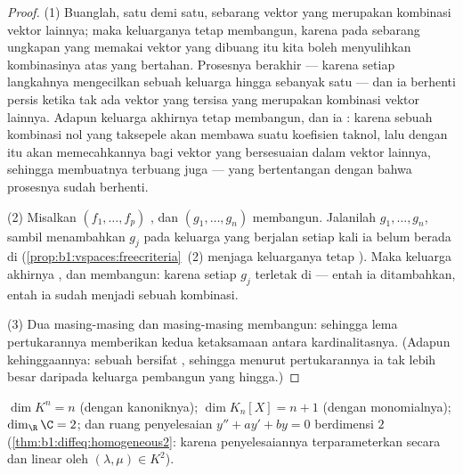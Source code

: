 \begin{proof}
(1) Buanglah, satu demi satu, sebarang vektor yang merupakan kombinasi
vektor lainnya; maka keluarganya tetap membangun, karena pada sebarang ungkapan
yang memakai vektor yang dibuang itu kita boleh menyulihkan kombinasinya atas
yang bertahan. Prosesnya berakhir --- karena setiap langkahnya mengecilkan sebuah
keluarga hingga sebanyak satu --- dan ia berhenti persis ketika tak ada vektor
yang tersisa yang merupakan kombinasi vektor lainnya. Adapun keluarga akhirnya tetap
membangun, dan ia : karena sebuah kombinasi nol yang taksepele akan
membawa suatu koefisien taknol, lalu  dengan itu akan memecahkannya
bagi vektor yang bersesuaian dalam vektor lainnya, sehingga membuatnya
terbuang juga --- yang bertentangan dengan bahwa prosesnya sudah
berhenti.

(2) Misalkan $(f_1, \dots, f_p)$ , dan $(g_1, \dots, g_n)$ membangun.
Jalanilah $g_1, \dots, g_n$, sambil menambahkan $g_j$ pada keluarga yang berjalan
setiap kali ia belum berada di 
(\cref{prop:b1:vspaces:freecriteria}~(2) menjaga keluarganya tetap ).
Maka keluarga akhirnya , dan membangun: karena setiap $g_j$ terletak di
 --- entah ia ditambahkan, entah ia sudah menjadi sebuah kombinasi.

(3) Dua  masing-masing  dan masing-masing membangun: sehingga lema pertukarannya
memberikan kedua ketaksamaan antara kardinalitasnya. (Adapun kehinggaannya:
sebuah  bersifat , sehingga menurut pertukarannya ia tak lebih besar daripada keluarga
pembangun yang hingga.)
\end{proof}

\begin{example}\label{ex:b1:findim:dims}
$\dim K^n = n$ (dengan  kanoniknya); $\dim K_n[X] = n + 1$ (dengan monomialnya);
$\dim_\R \C = 2$; dan ruang penyelesaian $y'' + ay' + by = 0$ berdimensi
$2$ (\cref{thm:b1:diffeq:homogeneous2}: karena penyelesaiannya
terparameterkan secara  dan linear oleh $(\lambda, \mu) \in K^2$).
\end{example}

